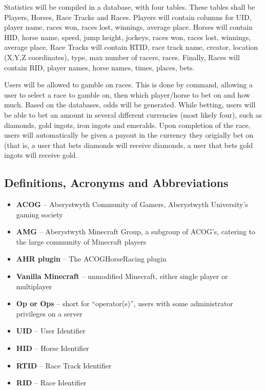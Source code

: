 \documentclass[a4paper, 11pt]{article} %
\begin{document}
Statistics will be compiled in a database, with four tables. These tables shall be Players, Horses, Race Tracks and Races. Players will contain columns for UID, player name, races won, races lost, winnings, average place. Horses will contain HID, horse name, speed, jump height, jockeys, races won, races lost, winnings, average place. Race Tracks will contain RTID, race track name, creator, location (X,Y,Z coordinates), type, max number of racers, races. Finally, Races will contain RID, player names, horse names, times, places, bets.

Users will be allowed to gamble on races. This is done by command, allowing a user to select a race to gamble on, then which player/horse to bet on and how much. Based on the databases, odds will be generated. While betting, users will be able to bet an amount in several different currencies (most likely four), such as diamonds, gold ingots, iron ingots and emeralds. Upon completion of the race, users will automatically be given a payout in the currency they origially bet on (that is, a user that bets diamonds will receive diamonds, a user that bets gold ingots will receive gold.

\subsection{Definitions, Acronyms and Abbreviations}

\begin{itemize}
	\item \textbf{ACOG} -- Aberystwyth Community of Gamers, Aberystwyth University's gaming society
	\item \textbf{AMG} -- Aberystwyth Minecraft Group, a subgroup of ACOG's, catering to the large community of Minecraft players
	\item \textbf{AHR plugin} -- The ACOGHorseRacing plugin
	\item \textbf{Vanilla Minecraft} -- unmodified Minecraft, either single player or multiplayer
	\item \textbf{Op or Ops} -- short for ``operator(s)'', users with some administrator privileges on a server
	\item \textbf{UID} -- User Identifier
	\item \textbf{HID} -- Horse Identifier
	\item \textbf{RTID} -- Race Track Identifier
	\item \textbf{RID} -- Race Identifier
\end{itemize}
\end{document}
